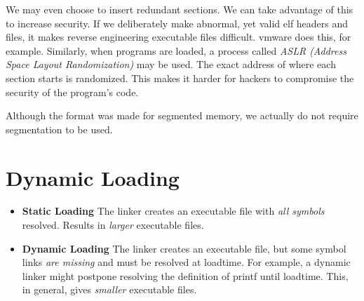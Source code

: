 We may even choose to insert redundant sections. 
We can take advantage of this to increase security. 
If we deliberately make abnormal, yet valid elf headers and files, 
it makes reverse engineering executable files difficult. vmware 
does this, for example. Similarly, when programs are loaded, a process called 
\textit{ASLR (Address Space Layout Randomization)} may be used. 
The exact address of where each section starts is randomized. 
This makes it harder for hackers to compromise the security of the program’s code. 


Although the format was made for segmented memory, 
we actually do not require segmentation to be used. 


\section{Dynamic Loading}

\begin{itemize}   
\renewcommand{\labelitemi}{$\Box$}
\item \textbf{Static Loading} The linker creates an executable file with 
\textit{all symbols} resolved. Results in \textit{larger} executable ﬁles. 
\item \textbf{Dynamic Loading} The linker creates an executable file, but some
symbol links \textit{are missing} and must be resolved at loadtime. 
For example, a dynamic linker might postpone resolving the definition of printf until loadtime.
This, in general, gives \textit{smaller} executable ﬁles. 
\end{itemize}